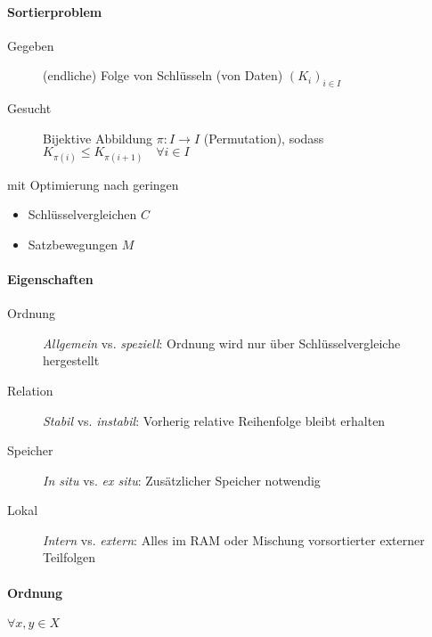 \begin{mzImportant}
  \paragraph{Sortierproblem}

  \begin{description}
    \item[Gegeben] (endliche) Folge von Schlüsseln (von Daten) $(K_i)_{i \in I}$
    \item[Gesucht] Bijektive Abbildung $\pi: I \rightarrow I$ (Permutation), sodass $K_{\pi(i)} \leq K_{\pi(i + 1)} \quad \forall i \in I$
  \end{description}
\end{mzImportant}

mit Optimierung nach geringen

\begin{itemize}
  \item Schlüsselvergleichen $C$
  \item Satzbewegungen $M$
\end{itemize}

\paragraph{Eigenschaften}

\begin{mzImportant}
  \begin{description}
    \item [Ordnung] \emph{Allgemein} vs. \emph{speziell}: Ordnung wird nur über Schlüsselvergleiche hergestellt
    \item [Relation] \emph{Stabil} vs. \emph{instabil}: Vorherig relative Reihenfolge bleibt erhalten
    \item [Speicher] \emph{In situ} vs. \emph{ex situ}: Zusätzlicher Speicher notwendig
    \item [Lokal] \emph{Intern} vs. \emph{extern}: Alles im RAM oder Mischung vorsortierter externer Teilfolgen
  \end{description}
\end{mzImportant}

\paragraph{Ordnung} $\forall x, y \in X$

